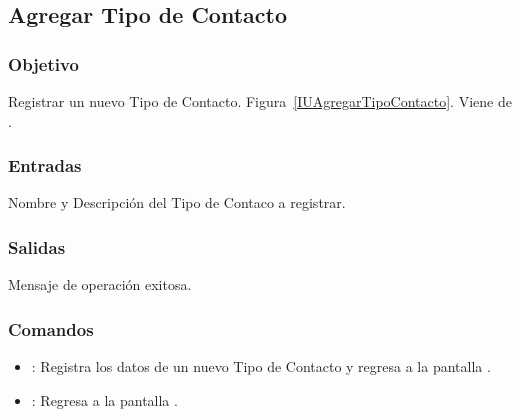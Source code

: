 \subsection{Agregar Tipo de Contacto}
\subsubsection{Objetivo}
Registrar un nuevo Tipo de Contacto. Figura~\ref{IUAgregarTipoContacto}. Viene de .




\subsubsection{Entradas}
Nombre y Descripción del Tipo de Contaco a registrar.

\subsubsection{Salidas}
Mensaje de operación exitosa.


\subsubsection{Comandos}
\begin{itemize}
 \item {}: Registra los datos de un nuevo Tipo de Contacto y regresa a la pantalla .
 \item {}: Regresa a la pantalla .
\end{itemize}






